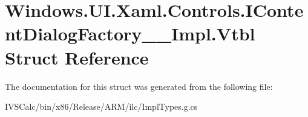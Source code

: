 \hypertarget{struct_windows_1_1_u_i_1_1_xaml_1_1_controls_1_1_i_content_dialog_factory_____impl_1_1_vtbl}{}\section{Windows.\+U\+I.\+Xaml.\+Controls.\+I\+Content\+Dialog\+Factory\+\_\+\+\_\+\+Impl.\+Vtbl Struct Reference}
\label{struct_windows_1_1_u_i_1_1_xaml_1_1_controls_1_1_i_content_dialog_factory_____impl_1_1_vtbl}


The documentation for this struct was generated from the following file\+:\begin{DoxyCompactItemize}
\item 
I\+V\+S\+Calc/bin/x86/\+Release/\+A\+R\+M/ilc/Impl\+Types.\+g.\+cs\end{DoxyCompactItemize}
